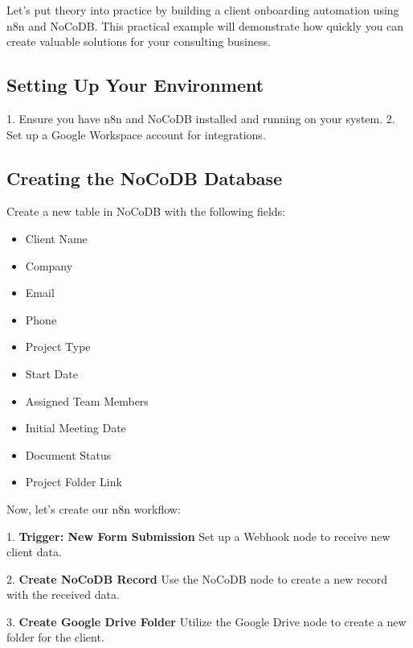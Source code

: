 Let's put theory into practice by building a client onboarding automation using n8n and NoCoDB. This practical example will demonstrate how quickly you can create valuable solutions for your consulting business.

\subsection{Setting Up Your Environment}

1. Ensure you have n8n and NoCoDB installed and running on your system.
2. Set up a Google Workspace account for integrations.

\subsection{Creating the NoCoDB Database}

Create a new table in NoCoDB with the following fields:
\begin{itemize}
    \item Client Name
    \item Company
    \item Email
    \item Phone
    \item Project Type
    \item Start Date
    \item Assigned Team Members
    \item Initial Meeting Date
    \item Document Status
    \item Project Folder Link
\end{itemize}

Now, let's create our n8n workflow:

1. \textbf{Trigger: New Form Submission}
Set up a Webhook node to receive new client data.


2. \textbf{Create NoCoDB Record}
Use the NoCoDB node to create a new record with the received data.


3. \textbf{Create Google Drive Folder}
Utilize the Google Drive node to create a new folder for the client.


